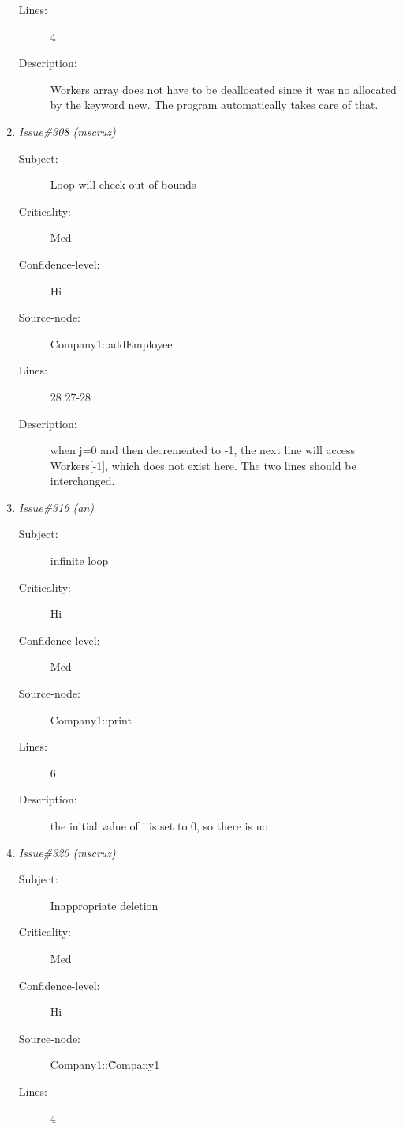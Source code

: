 \begin{enumerate}
\begin{description}
\item [Lines:] 4

\item [Description:] Workers array does not have to be deallocated
since it was no allocated by the keyword new.  The program automatically
takes care of that.
\end{description}
\item {\it Issue\#308 (mscruz)}
\begin{description}
\item [Subject:] Loop will check out of bounds
\item [Criticality:] Med
\item [Confidence-level:] Hi
\item [Source-node:] Company1::addEmployee

\item [Lines:] 28 27-28

\item [Description:] when j=0 and then decremented to -1, the next
line will access Workers[-1], which does not exist here.  The two lines
should be interchanged.
\end{description}
\item {\it Issue\#316 (an)}
\begin{description}
\item [Subject:] infinite loop
\item [Criticality:] Hi
\item [Confidence-level:] Med
\item [Source-node:] Company1::print

\item [Lines:] 6

\item [Description:] the initial value of i is set to 0, so there
is no
\end{description}
\item {\it Issue\#320 (mscruz)}
\begin{description}
\item [Subject:] Inappropriate deletion
\item [Criticality:] Med
\item [Confidence-level:] Hi
\item [Source-node:] Company1::\~Company1

\item [Lines:] 4


\end{description}
\end{enumerate}
